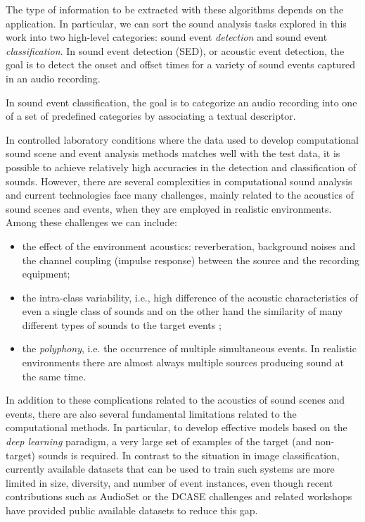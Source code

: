 The type of information to be extracted with these algorithms depends on the application. In particular, we can sort the sound analysis tasks explored in this work into two high-level categories: sound event \textit{detection} and sound event \textit{classification}.
In sound event detection (SED), or acoustic event detection, the goal is to detect the onset and offset times for a variety of sound events captured in an audio recording. 

In sound event classification, the goal is to categorize an audio recording into one of a set of predefined categories by associating a textual descriptor.

In controlled laboratory conditions where the data used to develop computational sound scene and event analysis methods matches well with the test data, it is possible to achieve relatively high accuracies in the detection and classification of sounds.  However, there are several complexities in computational sound analysis and current technologies face many challenges, mainly related to the acoustics of sound scenes and events, when they are employed in realistic environments.
Among these challenges we can include:
\begin{itemize}
	\item the effect of the environment acoustics: reverberation, background noises and the channel coupling (impulse response) between the source and the recording equipment;
	\item the intra-class variability, i.e., high difference of the acoustic characteristics of even a single class of sounds and on the other hand the similarity of many different types of sounds to the target events  \cite{stowell2015acoustic};
	\item the \textit{polyphony}, i.e. the occurrence of multiple simultaneous events. In realistic environments there
are almost always multiple sources producing sound at the same time. 
\end{itemize}

In addition to these complications related to the acoustics of sound scenes and
events, there are also several fundamental limitations related to the computational methods. In particular, to develop effective models based on the \textit{deep learning} paradigm, a very large set of examples of the
target (and non-target) sounds is required. In contrast to the situation in image classification,
 currently available datasets that can be used to train such systems are more limited in size, diversity, and number of event
 instances, even though recent contributions such as AudioSet \cite{gemmeke2017audio} or the DCASE challenges
and related workshops \cite{DCASE2017Workshop, mesaros2016tut, dcase2018web} have provided public available datasets to reduce this gap.



